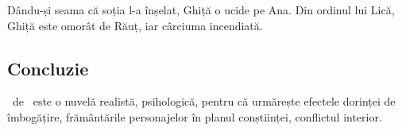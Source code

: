 Dându-și seama că soția l-a înșelat, Ghiță o ucide pe Ana. Din ordinul lui Lică, Ghiță este omorât de Răuț, iar cârciuma incendiată.


\subsection{Concluzie}

\operatitle\ de \operaauthor\ este o nuvelă realistă, psihologică, pentru că urmărește efectele dorinței de îmbogățire, frământările personajelor în planul conștiinței, conflictul interior.

